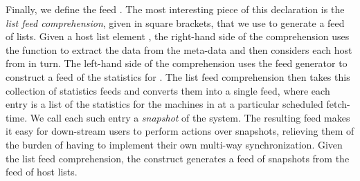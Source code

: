 Finally, we define the feed .  The most interesting piece
of this declaration is the {\em list feed comprehension}, given in
square brackets, that we use to generate a feed of lists. 
Given a host list element , the right-hand side of the comprehension
uses the  function to extract the data from the meta-data and
then considers each host  from  in turn.  The left-hand side of
the comprehension uses the  feed generator to construct
a feed of the statistics for .  The list feed comprehension then
takes this collection of statistics feeds and converts them into a
single feed, where each entry is a list of the statistics for
the machines in  at a particular scheduled fetch-time.  
We call each such entry a \textit{snapshot} of the system.
The resulting feed makes it easy for down-stream users to perform
actions over snapshots, relieving them of the burden of having to
implement their own multi-way synchronization.
Given the list feed comprehension, the  construct
generates a feed of snapshots from the feed of host lists.  




